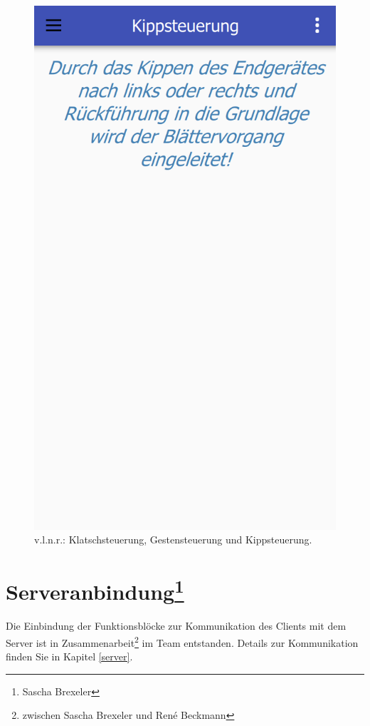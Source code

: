 \begin{figure}[ht!]
\begin{minipage}{0.31\linewidth}
		\includegraphics[scale=0.5]{GUI/Bilder/Kippsteuerung.PNG}
	\end{minipage}
	\caption[v.l.n.r.: Klatschsteuerung, Gestensteuerung und Kippsteuerung]{v.l.n.r.: Klatschsteuerung, Gestensteuerung und Kippsteuerung.\footnotemark}
	\label{client:InformationenBedienhilfen}
\end{figure}



\section[Serveranbindung]{Serveranbindung\footnote{Sascha Brexeler}}
\label{client-Serveranbindung}
Die Einbindung der Funktionsblöcke zur Kommunikation des Clients mit dem Server ist in Zusammenarbeit\footnote{zwischen Sascha Brexeler und René Beckmann} im Team entstanden. Details zur Kommunikation finden Sie in Kapitel \ref{server}.


